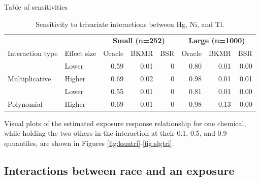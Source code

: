 \documentclass[12pt, twoside]{amherstthesis}
\begin{document}
Table of sensitivities
\begin{table}

\caption{\label{tab:threewaysens}Sensitivity to trivariate interactions between Hg, Ni, and Tl.}
\centering
\begin{tabular}[t]{llrrrrrr}
\toprule
\multicolumn{2}{c}{\textbf{ }} & \multicolumn{3}{c}{\textbf{Small (n=252)}} & \multicolumn{3}{c}{\textbf{Large (n=1000)}} \\
\cmidrule(l{3pt}r{3pt}){3-5} \cmidrule(l{3pt}r{3pt}){6-8}
Interaction type & Effect size & Oracle & BKMR & BSR & Oracle & BKMR & BSR\\
\midrule
 & Lower & 0.59 & 0.01 & 0 & 0.80 & 0.01 & 0.00\\

\multirow{-2}{*}{\raggedright\arraybackslash Multiplicative} & Higher & 0.69 & 0.02 & 0 & 0.98 & 0.01 & 0.01\\
\addlinespace
 & Lower & 0.55 & 0.01 & 0 & 0.81 & 0.01 & 0.00\\

\multirow{-2}{*}{\raggedright\arraybackslash Polynomial} & Higher & 0.69 & 0.01 & 0 & 0.98 & 0.13 & 0.00\\
\bottomrule
\end{tabular}
\end{table}
Visual plots of the estimated exposure response relationship for one chemical, while holding the two others in the interaction at their 0.1, 0.5, and 0.9 quuantiles, are shown in Figures \ref{fig:ksmtri}-\ref{fig:slgtri}.

\hypertarget{interactions-between-race-and-an-exposure}{%
\subsection{Interactions between race and an exposure}\label{interactions-between-race-and-an-exposure}}
\end{document}
